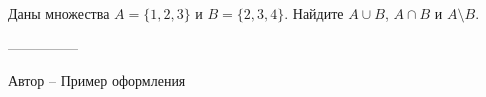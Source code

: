 \question
Даны множества $A=\{1,2,3\}$ и $B=\{2,3,4\}$.
Найдите $A\cup B$, $A\cap B$ и $A\setminus B$.

---------------

Автор -- Пример оформления
